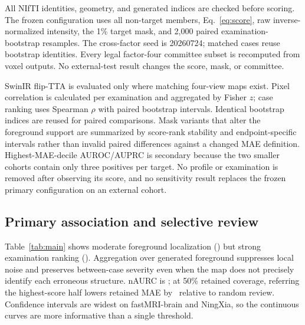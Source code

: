 \documentclass{article}
\begin{document}
\begin{table}[!t]
 \centering
 \caption{Cohorts and stored neural outputs. Analytical references are available for every profile.}
 \resizebox{\columnwidth}{!}{}
 \label{tab:protocol}
\end{table}

All NIfTI identities, geometry, and generated indices are checked before scoring. The frozen configuration uses all non-target members, Eq.~\eqref{eq:score}, raw inverse-normalized intensity, the 1\% target mask, and 2,000 paired examination-bootstrap resamples. The cross-factor seed is 20260724; matched cases reuse bootstrap identities. Every legal factor-four committee subset is recomputed from voxel outputs. No external-test result changes the score, mask, or committee.

SwinIR flip-TTA is evaluated only where matching four-view maps exist. Pixel correlation is calculated per examination and aggregated by Fisher $z$; case ranking uses Spearman $\rho$ with paired bootstrap intervals. Identical bootstrap indices are reused for paired comparisons. Mask variants that alter the foreground support are summarized by score-rank stability and endpoint-specific intervals rather than invalid paired differences against a changed MAE definition. Highest-MAE-decile AUROC/AUPRC is secondary because the two smaller cohorts contain only three positives per target. No profile or examination is removed after observing its score, and no sensitivity result replaces the frozen primary configuration on an external cohort.

\subsection{Primary association and selective review}
\begin{table}[!t]
 \centering
 \caption{All ten pre-specified profiles. Lower nAURC is better; coverage is retained fraction.}
 \resizebox{\columnwidth}{!}{}
 \label{tab:main}
\end{table}

Table~\ref{tab:main} shows moderate foreground localization (\PixelFisherRange) but strong examination ranking (\CaseSpearmanRange). Aggregation over generated foreground suppresses local noise and preserves between-case severity even when the map does not precisely identify each erroneous structure. nAURC is \NAURCRange; at 50\% retained coverage, referring the highest-score half lowers retained MAE by \RRRFiftyRange\ relative to random review. Confidence intervals are widest on fastMRI-brain and NingXia, so the continuous curves are more informative than a single threshold.
\end{document}
